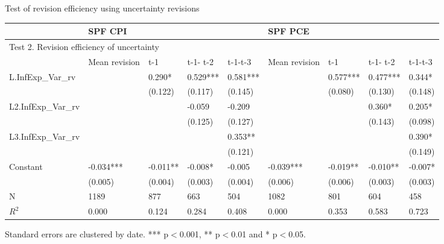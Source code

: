 \documentclass{beamer}
\begin{document}
\begin{frame}{Test of revision efficiency using uncertainty revisions}

\begin{adjustbox}{width=0.9\textwidth}
	\begin{threeparttable}
		\label{RevEfficiency}
		\begin{tabular}{lllllllll}
			\hline 
			& \multicolumn{4}{l}{SPF CPI}                     & \multicolumn{4}{l}{SPF PCE}                       \\
			\hline 
			\multicolumn{9}{l}{Test 2. Revision efficiency of uncertainty}                                                            \\
			\hline 
			& Mean revision & t-1       & t-1- t-2 & t-1-t-3  & Mean revision & t-1       & t-1- t-2  & t-1-t-3   \\
			\hline 
			L.InfExp\_Var\_rv   &               & 0.290*    & 0.529*** & 0.581*** &               & 0.577***  & 0.477***  & 0.344*    \\
			&               & (0.122)   & (0.117)  & (0.145)  &               & (0.080)   & (0.130)   & (0.148)   \\
			L2.InfExp\_Var\_rv  &               &           & -0.059   & -0.209   &               &           & 0.360*    & 0.205*    \\
			&               &           & (0.125)  & (0.127)  &               &           & (0.143)   & (0.098)   \\
			L3.InfExp\_Var\_rv  &               &           &          & 0.353**  &               &           &           & 0.390*    \\
			&               &           &          & (0.121)  &               &           &           & (0.149)   \\
			Constant              & -0.034***     & -0.011**  & -0.008*  & -0.005   & -0.039***     & -0.019**  & -0.010**  & -0.007*   \\
			& (0.005)       & (0.004)   & (0.003)  & (0.004)  & (0.006)       & (0.006)   & (0.003)   & (0.003)   \\
			\hline 
			N                   & 1189          & 877       & 663      & 504      & 1082          & 801       & 604       & 458       \\
			$R^2$                 & 0.000         & 0.124     & 0.284    & 0.408    & 0.000         & 0.353     & 0.583     & 0.723    \\
			\hline 
		\end{tabular} 
		\begin{tablenotes}
			\item Standard errors are clustered by date. *** p$<$0.001, ** p$<$0.01 and * p$<$0.05.
		\end{tablenotes}
	\end{threeparttable}
\end{adjustbox}

\end{frame}
\end{document}
